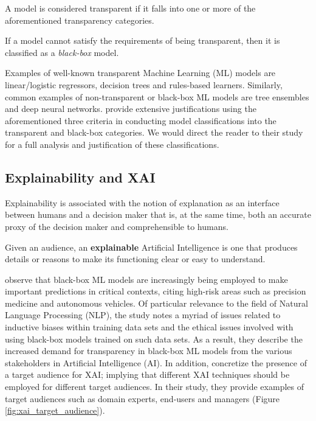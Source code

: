 \begin{remark}
  A model is considered transparent if it falls into one or more of the aforementioned transparency categories.
\end{remark}

\begin{remark}
  If a model cannot satisfy the requirements of being transparent, then it is classified as a \textit{black-box} model. 
\end{remark}

Examples of well-known transparent Machine Learning (ML) models are linear/logistic regressors, decision trees and rules-based learners. Similarly, common examples of non-transparent or black-box ML models are tree ensembles and deep neural networks. \citet{arrieta2020explainable} provide extensive justifications using the aforementioned three criteria in conducting model classifications into the transparent and black-box categories. We would direct the reader to their study for a full analysis and justification of these classifications.

\subsection{Explainability and XAI}

\begin{definition}[Explainability]
  Explainability is associated with the notion of explanation as an interface between humans and a decision maker that is, at the same time, both an accurate proxy of the decision maker and comprehensible to humans. 
\end{definition}

\begin{definition}
  Given an audience, an \textbf{explainable} Artificial Intelligence is one that produces details or reasons to make its functioning clear or easy to understand.
\end{definition}

\citet{arrieta2020explainable} observe that black-box ML models are increasingly being employed to make important predictions in critical contexts, citing high-risk areas such as precision medicine and autonomous vehicles. Of particular relevance to the field of Natural Language Processing (NLP), the study notes a myriad of issues related to inductive biases within training data sets and the ethical issues involved with using black-box models trained on such data sets. As a result, they describe the increased demand for transparency in black-box ML models from the various stakeholders in Artificial Intelligence (AI). In addition, \citet{arrieta2020explainable} concretize the presence of a target audience for XAI; implying that different XAI techniques should be employed for different target audiences. In their study, they provide examples of target audiences such as domain experts, end-users and managers (Figure \ref{fig:xai_target_audience}).

